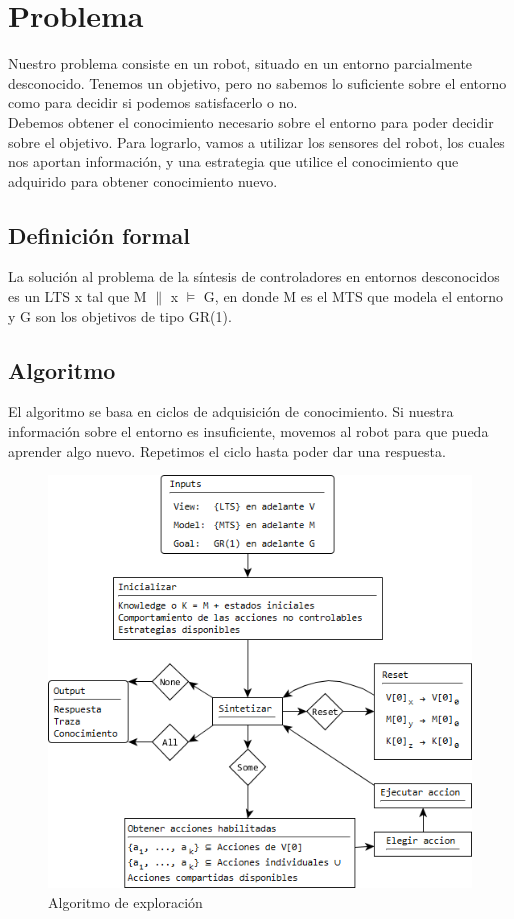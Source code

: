 \chapter{Problema}

Nuestro problema consiste en un robot, situado en un entorno parcialmente desconocido. Tenemos un objetivo, pero no 
sabemos lo suficiente sobre el entorno como para decidir si podemos satisfacerlo o no.\\
Debemos obtener el conocimiento necesario sobre el entorno para poder decidir sobre el objetivo. Para lograrlo, vamos
a utilizar los sensores del robot, los cuales nos aportan información, y una estrategia que utilice
el conocimiento que adquirido para obtener conocimiento nuevo.

\section{Definición formal}

La solución al problema de la síntesis de controladores en entornos desconocidos es un LTS x tal que M $\parallel$ x $\models$ G, 
en donde M es el MTS que modela el entorno y G son los objetivos de tipo GR(1).

\section{Algoritmo}

El algoritmo se basa en ciclos de adquisición de conocimiento. Si nuestra información sobre el entorno es insuficiente,
movemos al robot para que pueda aprender algo nuevo. Repetimos el ciclo hasta poder dar una respuesta.

\begin{figure}[H]
  \centering
    \includegraphics{Imagenes/Algoritmo/Algoritmo.png}
  \caption{Algoritmo de exploración}
  \label{fig:Algoritmo}
\end{figure}

